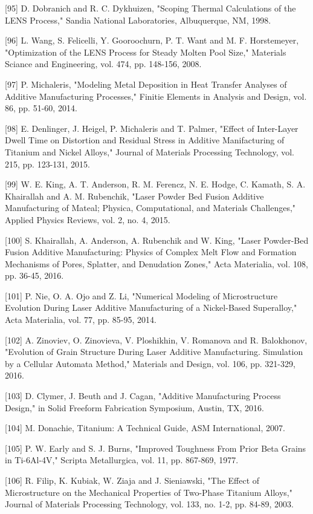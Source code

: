 \documentclass[10pt]{article}
\begin{document}
[95] D. Dobranich and R. C. Dykhuizen, "Scoping Thermal Calculations of the LENS Process," Sandia National Laboratories, Albuquerque, NM, 1998.

[96] L. Wang, S. Felicelli, Y. Gooroochurn, P. T. Want and M. F. Horstemeyer, "Optimization of the LENS Process for Steady Molten Pool Size," Materials Sciance and Engineering, vol. 474, pp. 148-156, 2008.

[97] P. Michaleris, "Modeling Metal Deposition in Heat Transfer Analyses of Additive Manufacturing Processes," Finitie Elements in Analysis and Design, vol. 86, pp. 51-60, 2014.

[98] E. Denlinger, J. Heigel, P. Michaleris and T. Palmer, "Effect of Inter-Layer Dwell Time on Distortion and Residual Stress in Additive Manifacturing of Titanium and Nickel Alloys," Journal of Materials Processing Technology, vol. 215, pp. 123-131, 2015.

[99] W. E. King, A. T. Anderson, R. M. Ferencz, N. E. Hodge, C. Kamath, S. A. Khairallah and A. M. Rubenchik, "Laser Powder Bed Fusion Additive Manufacturing of Mateal; Physica, Computational, and Materials Challenges," Applied Physics Reviews, vol. 2, no. 4, 2015.

[100] S. Khairallah, A. Anderson, A. Rubenchik and W. King, "Laser Powder-Bed Fusion Additive Manufacturing: Physics of Complex Melt Flow and Formation Mechanisms of Pores, Splatter, and Denudation Zones," Acta Materialia, vol. 108, pp. 36-45, 2016.

[101] P. Nie, O. A. Ojo and Z. Li, "Numerical Modeling of Microstructure Evolution During Laser Additive Manufacturing of a Nickel-Based Superalloy," Acta Materialia, vol. 77, pp. 85-95, 2014.

[102] A. Zinoviev, O. Zinovieva, V. Ploshikhin, V. Romanova and R. Balokhonov, "Evolution of Grain Structure During Laser Additive Manufacturing. Simulation by a Cellular Automata Method," Materials and Design, vol. 106, pp. 321-329, 2016.

[103] D. Clymer, J. Beuth and J. Cagan, "Additive Manufacturing Process Design," in Solid Freeform Fabrication Symposium, Austin, TX, 2016.

[104] M. Donachie, Titanium: A Technical Guide, ASM International, 2007.

[105] P. W. Early and S. J. Burns, "Improved Toughness From Prior Beta Grains in Ti-6Al-4V," Scripta Metallurgica, vol. 11, pp. 867-869, 1977.

[106] R. Filip, K. Kubiak, W. Ziaja and J. Sieniawski, "The Effect of Microstructure on the Mechanical Properties of Two-Phase Titanium Alloys," Journal of Materials Processing Technology, vol. 133, no. 1-2, pp. 84-89, 2003.
\end{document}
